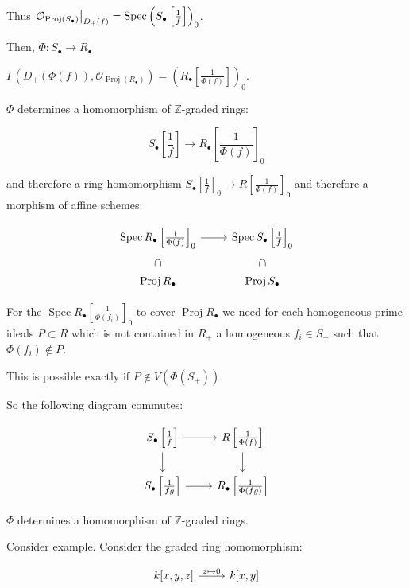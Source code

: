 \documentclass{article}
\theoremstyle{definition}
\begin{document}
    Thus \(\eval{\mathcal{O}_{\operatorname{Proj}(S_\bullet)}}_{D_+(f)} = \operatorname{Spec} \left( S_\bullet \left[ \frac{1}{f} \right] \right)_0\).
    
    Then, \(\Phi: S_\bullet \to R_\bullet\)

    \(\Gamma(D_+(\Phi(f)), \mathcal{O}_{\operatorname{Proj}(R_\bullet)}) = \left( R_\bullet \left[ \frac{1}{\Phi(f)} \right] \right)_0\).
    
    \(\Phi\) determines a homomorphism of \(\mathbb{Z}\)-graded rings:

    \[
        S_\bullet \left[ \frac{1}{f} \right] \to R_\bullet \left[ \frac{1}{\Phi(f)} \right]_0
    \]

    and therefore a ring homomorphism \(S_\bullet \left[ \frac{1}{f} \right]_0 \to R \left[ \frac{1}{\Phi(f)} \right]_0\) and therefore a morphism of affine schemes:

    \[
        \begin{tikzcd}
            \operatorname{Spec} R_\bullet \left[ \frac{1}{\Phi(f)} \right]_0 \ar[r] \ar[d, phantom, "\subset", sloped] & \operatorname{Spec} S_\bullet \left[ \frac{1}{f} \right]_0 \ar[d, phantom, "\subset", sloped] \\ \operatorname{Proj} R_\bullet & \operatorname{Proj} S_\bullet
        \end{tikzcd}
    \]

    For the \(\operatorname{Spec} R_\bullet \left[ \frac{1}{\Phi (f_i)} \right]_0\) to cover \(\operatorname{Proj} R_\bullet\) we need for each homogeneous prime ideals \(P \subset R\) which is not contained in \(R_+\) a homogeneous \(f_i \in S_+\) such that \(\Phi(f_i) \notin P\).
    
    This is possible exactly if \(P\notin V(\Phi(S_+))\).

    So the following diagram commutes:

    \[
        \begin{tikzcd}
            S_\bullet \left[ \frac{1}{f} \right] \ar[r] \ar[d] & R \left[ \frac{1}{\Phi (f)} \right] \ar[d] \\ S_\bullet \left[ \frac{1}{fg} \right] \ar[r] & R_\bullet \left[ \frac{1}{\Phi(fg)} \right] 
        \end{tikzcd}
    \]

    \(\Phi\) determines a homomorphism of \(\mathbb{Z}\)-graded rings.

    Consider example. Consider the graded ring homomorphism:

    \[
        \begin{tikzcd}
            k[x,y,z] \ar[r,"z \mapsto 0"] & k[x,y]
        \end{tikzcd}
    \]
\end{document}
